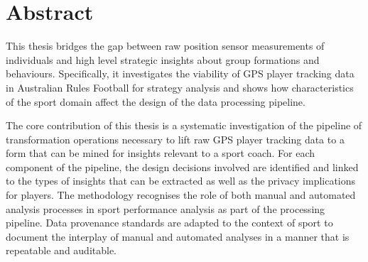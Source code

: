 





\chapter*{Abstract}
\vspace{-0.75cm}
This thesis bridges the gap between raw position sensor measurements of individuals and high level strategic insights about group formations and behaviours. Specifically, it investigates the viability of GPS player tracking data in Australian Rules Football for strategy analysis and shows how characteristics of the sport domain affect the design of the data processing pipeline.

The core contribution of this thesis is a systematic investigation of the pipeline of transformation operations necessary to lift raw GPS player tracking data to a form that can be mined for insights relevant to a sport coach. For each component of the pipeline, the design decisions involved are identified and linked to the types of insights that can be extracted as well as the privacy implications for players. The methodology recognises the role of both manual and automated analysis processes in sport performance analysis as part of the processing pipeline. Data provenance standards are adapted to the context of sport to document the interplay of manual and automated analyses in a manner that is repeatable and auditable.

